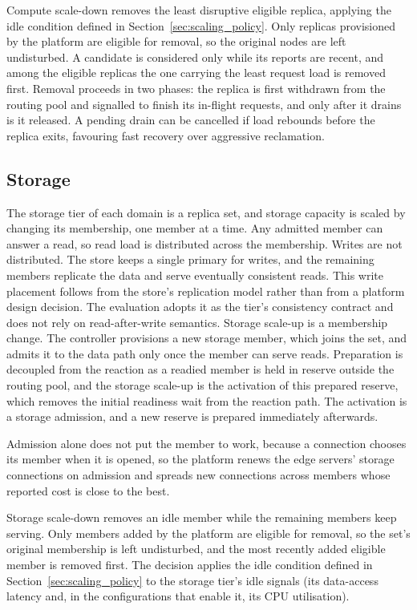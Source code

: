 ﻿\documentclass[12pt,reqno,twoside]{amsbook}
\begin{document}
Compute scale-down removes the least disruptive eligible replica, applying
the idle condition defined in Section~\ref{sec:scaling_policy}. 
Only replicas provisioned by the platform are eligible for removal, so the
original nodes are left undisturbed. A candidate is considered
only while its reports are recent, and among the eligible replicas the one
carrying the least request load is removed first.
Removal proceeds in two phases: the replica is first withdrawn
from the routing pool and signalled to finish its in-flight requests,
and only after it drains is it released.
A pending drain can be cancelled if load rebounds before the replica exits,
favouring fast recovery over aggressive reclamation.

\subsection{Storage}\label{sec:elastic_data}
The storage tier of each domain is a replica set, and storage capacity is
scaled by changing its membership, one member at a time. Any admitted member
can answer a read, so read load is distributed across the membership. Writes
are not distributed. The store keeps a single primary for writes, and the
remaining members replicate the data and serve eventually consistent reads.
This write placement follows from the store's replication model rather than
from a platform design decision. The evaluation adopts it as the tier's
consistency contract and does not rely on read-after-write semantics. Storage
scale-up is a membership change. The controller provisions a new storage
member, which joins the set, and admits it to the data path only once the
member can serve reads. Preparation is decoupled from the reaction as a readied
member is held in reserve outside the routing pool, and the storage scale-up is
the activation of this prepared reserve, which removes the initial readiness wait
from the reaction path. The activation is a storage admission, and a new reserve
is prepared immediately afterwards.

Admission alone does not put the member to work, because a connection
chooses its member when it is opened, so the platform renews the edge
servers' storage connections on admission and spreads new connections across
members whose reported cost is close to the best.

Storage scale-down removes an idle member while the remaining members keep
serving. Only members added by the platform are eligible for removal, so the
set's original membership is left undisturbed, and the most recently added
eligible member is removed first. The decision applies the idle condition
defined in Section~\ref{sec:scaling_policy} to the storage tier's idle signals
(its data-access latency and, in the configurations that enable
it, its CPU utilisation).
\end{document}
